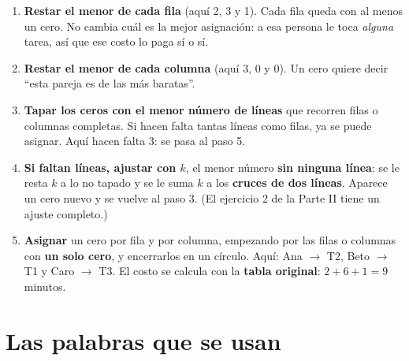 \documentclass[11pt,a4paper]{article}
\begin{document}
\begin{enumerate}[leftmargin=*, itemsep=3pt, label=\textbf{Paso \arabic*.}]
  \item \textbf{Restar el menor de cada fila} (aquí 2, 3 y 1). Cada fila queda con al menos un cero. No cambia cuál
        es la mejor asignación: a esa persona le toca \emph{alguna} tarea, así que ese costo lo paga sí o sí.
  \item \textbf{Restar el menor de cada columna} (aquí 3, 0 y 0). Un cero quiere decir ``esta pareja es de las más baratas''.
  \item \textbf{Tapar los ceros con el menor número de líneas} que recorren filas o columnas completas. Si hacen
        falta tantas líneas como filas, ya se puede asignar. Aquí hacen falta 3: se pasa al paso 5.
  \item \textbf{Si faltan líneas, ajustar con $k$}, el menor número \textbf{sin ninguna línea}: se le resta $k$ a lo
        no tapado y se le suma $k$ a los \textbf{cruces de dos líneas}. Aparece un cero nuevo y se vuelve al paso 3.
        (El ejercicio 2 de la Parte II tiene un ajuste completo.)
  \item \textbf{Asignar} un cero por fila y por columna, empezando por las filas o columnas con \textbf{un solo cero},
        y encerrarlos en un círculo. Aquí: Ana $\to$ T2, Beto $\to$ T1 y Caro $\to$ T3. El costo se calcula con la
        \textbf{tabla original}: $2 + 6 + 1 = 9$ minutos.
\end{enumerate}

\section{Las palabras que se usan}
\end{document}
